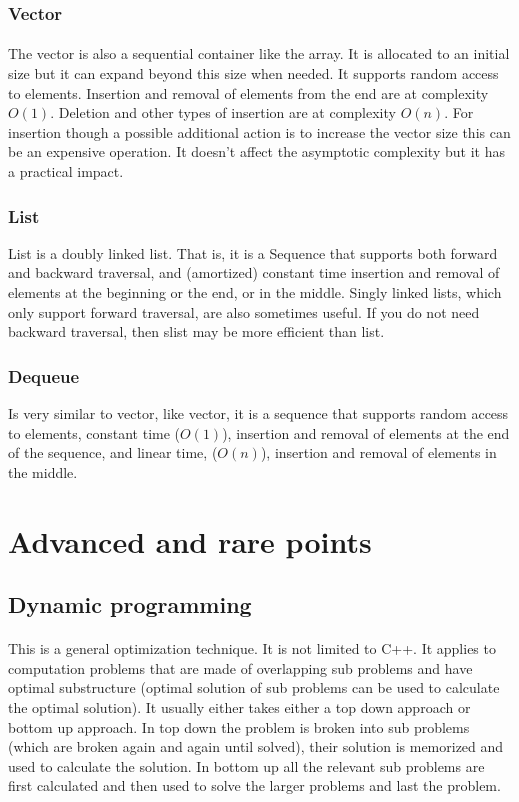 \documentclass{article}
\begin{document}
		 \subsubsection{Vector}
		  \paragraph{}
	  The vector is also a sequential container like the array. It is allocated to an initial size but it can expand beyond this size when needed. 
	  It supports random access to elements. Insertion and removal of elements from the end are at complexity $O(1)$.
	  Deletion and other types of insertion are at complexity $O(n)$.
	  For insertion though a possible additional action is to increase the vector size this can be an expensive operation. It doesn't affect the asymptotic complexity but it has a practical impact.
	
		 \subsubsection{List}
	 	List is a doubly linked list.
		 That is, it is a Sequence that supports both forward and backward traversal, and (amortized) constant time insertion and removal of elements at the beginning or the end, or in the middle.
		 Singly linked lists, which only support forward traversal, are also sometimes useful. If you do not need backward traversal, then slist may be more efficient than list. 
 
 		\subsubsection{Dequeue}
		Is very similar to  vector, like vector, it is a sequence that supports random access to elements, constant time ($O(1)$), insertion and removal of elements at the end of the sequence, and linear time, ($O(n)$), insertion and removal of elements in the middle.

\section {Advanced and rare points}

 \subsection {Dynamic programming}
 \paragraph{}
 This is a general optimization technique. It is not limited to C++.
 It applies to computation problems that are made of overlapping sub problems and have optimal substructure (optimal solution of sub problems can be used to calculate the optimal solution).
 It usually either takes either a top down approach or bottom up approach. In top down the problem is broken into sub problems (which are broken again and again until solved), their solution is memorized and used to calculate the solution. In bottom up all the relevant sub problems are first calculated and then used to solve the larger problems and last the problem.
\end{document}
